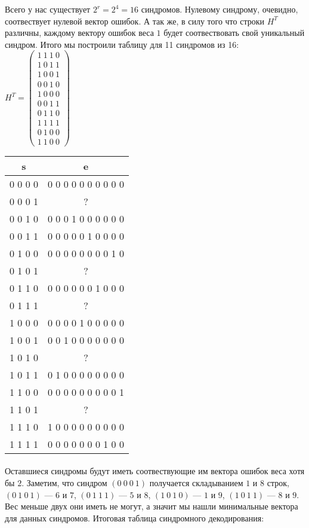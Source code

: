 \documentclass[fontsize=14pt]{article}
\begin{document}
Всего у нас существует $2^r = 2^4 = 16$ синдромов. Нулевому синдрому, очевидно, соотвествует нулевой вектор ошибок. А так же, в силу того что строки $H^T$ различны, каждому вектору ошибок веса $1$ будет соотвествовать свой уникальный синдром. Итого мы построили таблицу для 11 синдромов из 16:\\
$H^T = \begin{pmatrix}
1\ 1\ 1\ 0\\
1\ 0\ 1\ 1\\
1\ 0\ 0\ 1\\
0\ 0\ 1\ 0\\
1\ 0\ 0\ 0\\
0\ 0\ 1\ 1\\
0\ 1\ 1\ 0\\
1\ 1\ 1\ 1\\
0\ 1\ 0\ 0\\
1\ 1\ 0\ 0
\end{pmatrix}$
\hfill
\begin{tabular}{ |c|c| } 
\hline
s & e\\
\hline\hline 
0 0 0 0 & 0 0 0 0 0 0 0 0 0 0\\
\hline 
0 0 0 1 & ?\\
\hline
0 0 1 0 & 0 0 0 1 0 0 0 0 0 0\\ 
\hline
0 0 1 1 & 0 0 0 0 0 1 0 0 0 0\\ 
\hline
0 1 0 0 & 0 0 0 0 0 0 0 0 1 0\\ 
\hline
0 1 0 1 & ?\\ 
\hline
0 1 1 0 & 0 0 0 0 0 0 1 0 0 0\\ 
\hline
0 1 1 1 & ?\\ 
\hline
1 0 0 0 & 0 0 0 0 1 0 0 0 0 0\\ 
\hline
1 0 0 1 & 0 0 1 0 0 0 0 0 0 0\\
\hline
1 0 1 0 & ?\\ 
\hline
1 0 1 1 & 0 1 0 0 0 0 0 0 0 0\\ 
\hline
1 1 0 0 & 0 0 0 0 0 0 0 0 0 1\\ 
\hline
1 1 0 1 & ?\\ 
\hline
1 1 1 0 & 1 0 0 0 0 0 0 0 0 0\\ 
\hline
1 1 1 1 & 0 0 0 0 0 0 0 1 0 0\\
\hline
\end{tabular}

\paragraph*{}
Оставшиеся синдромы будут иметь соотвествующие им вектора ошибок веса хотя бы $2$. Заметим, что синдром $(0\ 0\ 0\ 1)$ получается складыванием $1$ и $8$ строк, $(0\ 1\ 0\ 1)$ --- $6$ и $7$, $(0\ 1\ 1\ 1)$ --- $5$ и $8$, $(1\ 0\ 1\ 0)$ --- $1$ и $9$, $(1\ 0\ 1\ 1)$ --- $8$ и $9$. Вес меньше двух они иметь не могут, а значит мы нашли минимальные вектора для данных синдромов. Итоговая таблица синдромного декодирования:
\end{document}
